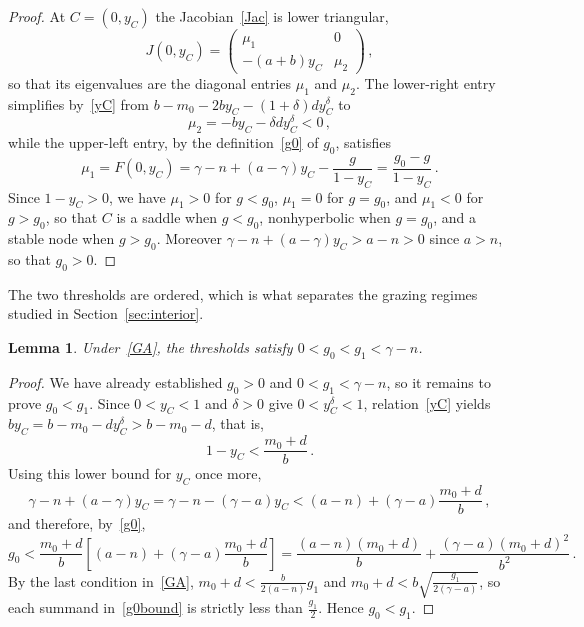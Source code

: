 \documentclass[reqno,11pt]{amsart}
\newtheorem{lem}[thm]{Lemma}
\numberwithin{equation}{section}
\begin{document}
\begin{proof}
At $C=(0,y_C)$ the Jacobian~\eqref{Jac} is lower triangular,
\[
J(0,y_C)=\begin{pmatrix}\mu_1 & 0\\[3pt] -(a+b)y_C & \mu_2\end{pmatrix}\,,
\]
so that its eigenvalues are the diagonal entries $\mu_1$ and $\mu_2$. The lower-right entry simplifies by~\eqref{yC} from $b-m_0-2by_C-(1+\delta)dy_C^{\delta}$ to
\[
\mu_2=-by_C-\delta dy_C^{\delta}<0\,,
\]
while the upper-left entry, by the definition~\eqref{g0} of $g_0$, satisfies
\[
\mu_1=F(0,y_C)=\gamma-n+(a-\gamma)y_C-\frac{g}{1-y_C}=\frac{g_0-g}{1-y_C}\,.
\]
Since $1-y_C>0$, we have $\mu_1>0$ for $g<g_0$, $\mu_1=0$ for $g=g_0$, and $\mu_1<0$ for $g>g_0$, so that $C$ is a saddle when $g<g_0$, nonhyperbolic when $g=g_0$, and a stable node when $g>g_0$. Moreover $\gamma-n+(a-\gamma)y_C>a-n>0$ since $a>n$, so that $g_0>0$.
\end{proof}

The two thresholds are ordered, which is what separates the grazing regimes studied in Section~\ref{sec:interior}.

\begin{lem}\label{lem:ordering}
Under~\eqref{GA}, the thresholds satisfy $0<g_0<g_1<\gamma-n$.
\end{lem}

\begin{proof}
We have already established $g_0>0$ and $0<g_1<\gamma-n$, so it remains to prove $g_0<g_1$. Since $0<y_C<1$ and $\delta>0$ give $0<y_C^{\delta}<1$, relation~\eqref{yC} yields $by_C=b-m_0-dy_C^{\delta}>b-m_0-d$, that is,
\[
1-y_C<\frac{m_0+d}{b}\,.
\]
Using this lower bound for $y_C$ once more,
\[
\gamma-n+(a-\gamma)y_C=\gamma-n-(\gamma-a)y_C<(a-n)+(\gamma-a)\frac{m_0+d}{b}\,,
\]
and therefore, by~\eqref{g0},
\begin{equation}\label{g0bound}
g_0<\frac{m_0+d}{b}\left[(a-n)+(\gamma-a)\frac{m_0+d}{b}\right]
=\frac{(a-n)(m_0+d)}{b}+\frac{(\gamma-a)(m_0+d)^2}{b^2}\,.
\end{equation}
By the last condition in~\eqref{GA}, $m_0+d<\tfrac{b}{2(a-n)}g_1$ and $m_0+d<b\sqrt{\tfrac{g_1}{2(\gamma-a)}}$, so each summand in~\eqref{g0bound} is strictly less than $\tfrac{g_1}{2}$. Hence $g_0<g_1$.
\end{proof}
\end{document}
